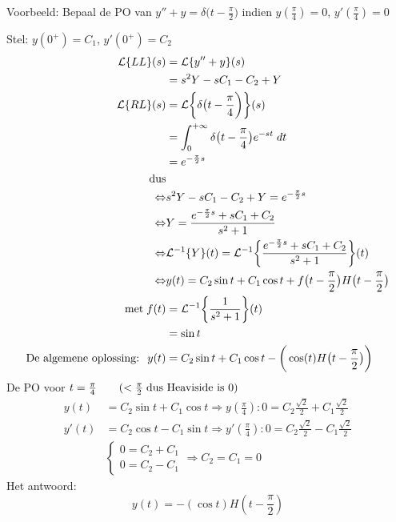 \documentclass[12pt]{report}
\newcommand{\example}[2]{
    \hrulefill
    
    Voorbeeld: #1
    
    #2
    
    \hrulefill
}
\begin{document}
\example{
  Bepaal de PO van $y'' + y = \delta\big(t - \frac{\pi}{2}\big)$ indien $y(\frac{\pi}{4}) = 0$, $y'(\frac{\pi}{4}) = 0$
}{
  Stel: $y(0^+) = C_1$, $y'(0^+) = C_2$
  \begin{equation*}
   \begin{split}
    \mathcal{L}\{LL\}(s) & = \mathcal{L}\{y'' + y\}(s) \\
			 & = s^2Y - sC_1 - C_2 + Y \\
    \mathcal{L}\{RL\}(s) & = \mathcal{L}\bigg\{\delta\big(t - \frac{\pi}{4}\bigg)\bigg\}(s) \\
                         & = \int_0^{+\infty}\delta\big(t - \frac{\pi}{4}\big)e^{-st} \; dt \\
                         & = e^{-\frac{\pi}{2}s} \\
    \hbox{dus} \\
    \Leftrightarrow & s^2Y - sC_1 - C_2 + Y = e^{-\frac{\pi}{2}s}  \\
    \Leftrightarrow & Y = \frac{e^{-\frac{\pi}{2}s} + sC_1 + C_2}{s^2 + 1} \\
    \Leftrightarrow & \mathcal{L}^{-1}\{Y\}(t) = \mathcal{L}^{-1}\bigg\{\frac{e^{-\frac{\pi}{2}s} + sC_1 + C_2}{s^2 + 1}\bigg\}(t) \\
    \Leftrightarrow & y(t) = C_2\sin t + C_1\cos t + f\big(t - \frac{\pi}{2}\big)H\big(t - \frac{\pi}{2}\big)\\
    \hbox{met}\; f(t) & = \mathcal{L}^{-1}\bigg\{\frac{1}{s^2 + 1}\bigg\}(t) \\
                      & = \sin t\\
    \hbox{De algemene oplossing: }\; y(t)  & =  C_2\sin t + C_1\cos t - \bigg(\cos(t) H\big(t - \frac{\pi}{2}\big)\bigg)
   \end{split}
  \end{equation*}
  De PO voor $t = \frac{\pi}{4} \qquad ( < \frac{\pi}{2}\;\hbox{dus Heaviside is 0})$
  \begin{equation*}
   \begin{split}
    y(t) & = C_2 \sin t + C_1 \cos t  \Rightarrow y(\frac{\pi}{4})  : 0 = C_2\frac{\sqrt{2}}{2} + C_1\frac{\sqrt{2}}{2}\\
    y'(t) & = C_2 \cos t - C_1 \sin t \Rightarrow y'(\frac{\pi}{4}) : 0 = C_2\frac{\sqrt{2}}{2} - C_1\frac{\sqrt{2}}{2}\\
    & \begin{cases}
     0 = C_2 + C_1 \\
     0 = C_2 - C_1
    \end{cases} \Rightarrow C_2 = C_1 = 0
   \end{split}
  \end{equation*}
    Het antwoord:
    $$y(t) = -(\cos t)H(t - \frac{\pi}{2})$$
}
\end{document}

